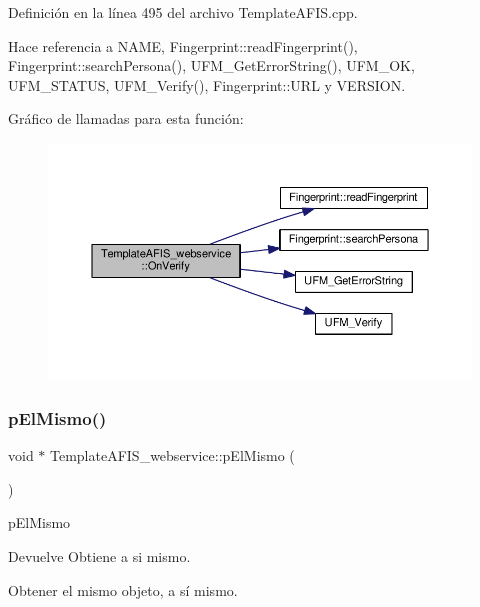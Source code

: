 Definición en la línea 495 del archivo Template\+A\+F\+I\+S.\+cpp.



Hace referencia a N\+A\+ME, Fingerprint\+::read\+Fingerprint(), Fingerprint\+::search\+Persona(), U\+F\+M\+\_\+\+Get\+Error\+String(), U\+F\+M\+\_\+\+OK, U\+F\+M\+\_\+\+S\+T\+A\+T\+US, U\+F\+M\+\_\+\+Verify(), Fingerprint\+::\+U\+RL y V\+E\+R\+S\+I\+ON.

Gráfico de llamadas para esta función\+:\nopagebreak
\begin{figure}[H]
\begin{center}
\leavevmode
\includegraphics[width=350pt]{classTemplateAFIS__webservice_ad2d94adf36b56bf3306e52e5e20ecaab_cgraph}
\end{center}
\end{figure}
\hypertarget{classTemplateAFIS__webservice_a85f73ddfc479ea1f9ba3a6467d1c028b}{}\label{classTemplateAFIS__webservice_a85f73ddfc479ea1f9ba3a6467d1c028b} 
\subsubsection{\texorpdfstring{p\+El\+Mismo()}{pElMismo()}}
{\footnotesize\ttfamily void $\ast$ Template\+A\+F\+I\+S\+\_\+webservice\+::p\+El\+Mismo (\begin{DoxyParamCaption}{ }\end{DoxyParamCaption})}



p\+El\+Mismo 

\begin{DoxyReturn}{Devuelve}
Obtiene a si mismo.
\end{DoxyReturn}
Obtener el mismo objeto, a sí mismo. 

